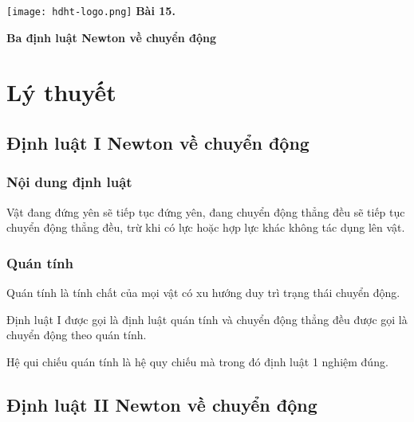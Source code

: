 \newcommand{\chapter}[2][]{
	\newcommand{\chapname}{#2}
	\begin{flushleft}
		\begin{minipage}[t]{\linewidth}
			\texttt{[image: hdht-logo.png]}
			\hspace{0pt}	
			\sffamily\bfseries\large Bài  15.
			\begin{flushleft}
				\huge\bfseries #1
			\end{flushleft}
		\end{minipage}
	\end{flushleft}
	\vspace{1cm}
	\normalfont\normalsize
}
\chapter[Ba định luật Newton về chuyển động]{Ba định luật Newton về chuyển động}
\section{Lý thuyết}

\subsection{Định luật I Newton về chuyển động}
\subsubsection{Nội dung định luật}
Vật đang đứng yên sẽ tiếp tục đứng yên, đang chuyển động thẳng đều sẽ tiếp tục chuyển động thẳng đều, trừ khi có lực hoặc hợp lực khác không tác dụng lên vật. 
\subsubsection{Quán tính}
Quán tính là tính chất của mọi vật có xu hướng duy trì trạng thái chuyển động. 

Định luật I được gọi là định luật quán tính và chuyển động thẳng đều được gọi là chuyển động theo quán tính.

Hệ qui chiếu quán tính là hệ quy chiếu mà trong đó định luật 1 nghiệm đúng. 
\subsection{Định luật II Newton về chuyển động}
